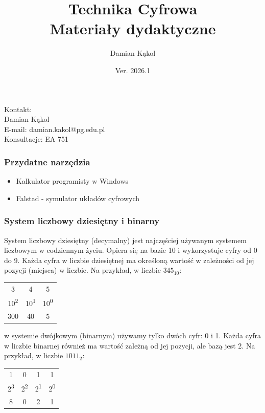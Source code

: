 \documentclass[a4paper,12pt]{article}
\title{Technika Cyfrowa\\Materiały dydaktyczne}
\author{Damian Kąkol}
\date{Ver. 2026.1}
\begin{document}
\maketitle
Kontakt: \\
Damian Kąkol \\
E-mail: damian.kakol@pg.edu.pl \\
Konsultacje: EA 751 \\
\subsubsection*{Przydatne narzędzia}
\begin{itemize}
    \item Kalkulator programisty w Windows
    \item Falstad - symulator układów cyfrowych
\end{itemize}

\subsubsection*{System liczbowy dziesiętny i binarny}
System liczbowy dziesiętny (decymalny) jest najczęściej używanym systemem liczbowym w codziennym życiu. Opiera się na bazie 10 i wykorzystuje cyfry od 0 do 9. Każda cyfra w liczbie dziesiętnej ma określoną wartość w zależności od jej pozycji (miejsca) w liczbie. Na przykład, w liczbie $345_{10}$:

\begin{table}[H]
\centering
\begin{tabular}{|c|c|c|}
\hline
3 & 4 & 5 \\
10\textsuperscript{2} & 10\textsuperscript{1} & 10\textsuperscript{0} \\
300 & 40 & 5 \\
\hline
\end{tabular}
\end{table}

w systemie dwójkowym (binarnym) używamy tylko dwóch cyfr: 0 i 1. Każda cyfra w liczbie binarnej również ma wartość zależną od jej pozycji, ale bazą jest 2. Na przykład, w liczbie $1011_2$:

\begin{table}[H]
\centering
\begin{tabular}{|c|c|c|c|}
\hline
1 & 0 & 1 & 1 \\
2\textsuperscript{3} & 2\textsuperscript{2} & 2\textsuperscript{1} & 2\textsuperscript{0} \\
8 & 0 & 2 & 1 \\
\hline
\end{tabular}
\end{table}
\end{document}
